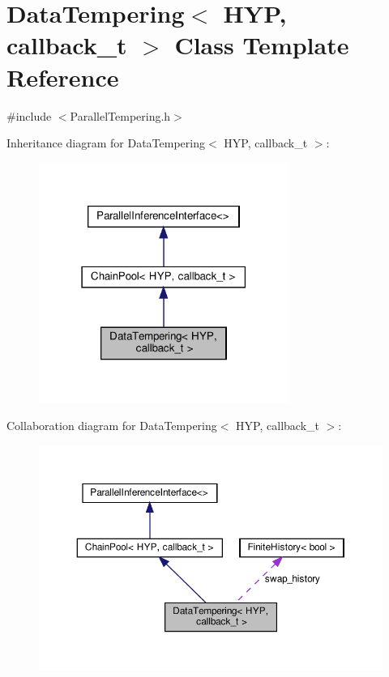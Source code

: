 \hypertarget{class_data_tempering}{}\section{Data\+Tempering$<$ H\+YP, callback\+\_\+t $>$ Class Template Reference}
\label{class_data_tempering}


{\ttfamily \#include $<$Parallel\+Tempering.\+h$>$}



Inheritance diagram for Data\+Tempering$<$ H\+YP, callback\+\_\+t $>$\+:\nopagebreak
\begin{figure}[H]
\begin{center}
\leavevmode
\includegraphics[width=231pt]{class_data_tempering__inherit__graph}
\end{center}
\end{figure}


Collaboration diagram for Data\+Tempering$<$ H\+YP, callback\+\_\+t $>$\+:\nopagebreak
\begin{figure}[H]
\begin{center}
\leavevmode
\includegraphics[width=350pt]{class_data_tempering__coll__graph}
\end{center}
\end{figure}
